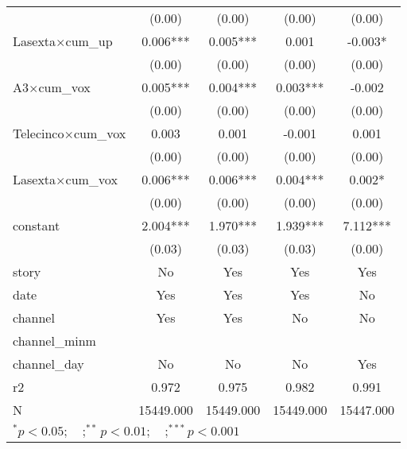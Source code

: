 \begin{tabular}{l*{4}{c}}
                    &      (0.00)   &      (0.00)   &      (0.00)   &      (0.00)   \\
Lasexta$\times$cum\_up&       0.006***&       0.005***&       0.001   &      -0.003*  \\
                    &      (0.00)   &      (0.00)   &      (0.00)   &      (0.00)   \\
A3$\times$cum\_vox   &       0.005***&       0.004***&       0.003***&      -0.002   \\
                    &      (0.00)   &      (0.00)   &      (0.00)   &      (0.00)   \\
Telecinco$\times$cum\_vox&       0.003   &       0.001   &      -0.001   &       0.001   \\
                    &      (0.00)   &      (0.00)   &      (0.00)   &      (0.00)   \\
Lasexta$\times$cum\_vox&       0.006***&       0.006***&       0.004***&       0.002*  \\
                    &      (0.00)   &      (0.00)   &      (0.00)   &      (0.00)   \\
constant            &       2.004***&       1.970***&       1.939***&       7.112***\\
                    &      (0.03)   &      (0.03)   &      (0.03)   &      (0.00)   \\
\midrule
story               &          No   &         Yes   &         Yes   &         Yes   \\
date                &         Yes   &         Yes   &         Yes   &          No   \\
channel             &         Yes   &         Yes   &          No   &          No   \\
channel\_minm        &               &               &               &               \\
channel\_day         &          No   &          No   &          No   &         Yes   \\
r2                  &       0.972   &       0.975   &       0.982   &       0.991   \\
N                   &   15449.000   &   15449.000   &   15449.000   &   15447.000   \\
\bottomrule
\multicolumn{5}{l}{\footnotesize $^{*}p<0.05; \quad ; ^{**} p<0.01; \quad ; ^{***}p<0.001$}\\
\end{tabular}
